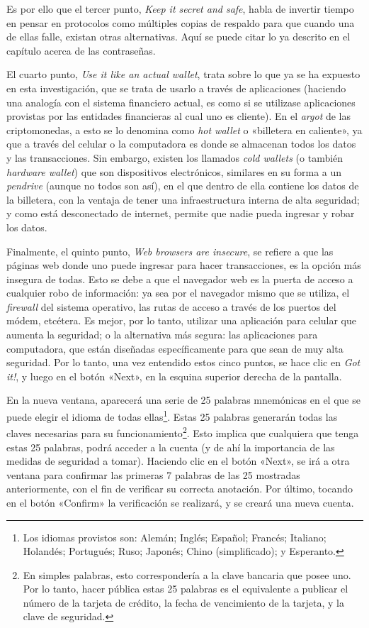\documentclass[12pt,a4paper,twoside]{book}
\begin{document}
Es por ello que el tercer punto, \textit{Keep it secret and safe}, habla de invertir tiempo en pensar en protocolos como múltiples copias de respaldo para que cuando una de ellas falle, existan otras alternativas. Aquí se puede citar lo ya descrito en el capítulo acerca de las contraseñas.

El cuarto punto, \textit{Use it like an actual wallet}, trata sobre lo que ya se ha expuesto en esta investigación, que se trata de usarlo a través de aplicaciones (haciendo una analogía con el sistema financiero actual, es como si se utilizase aplicaciones provistas por las entidades financieras al cual uno es cliente). En el \textit{argot} de las criptomonedas, a esto se lo denomina como \textit{hot wallet} o «billetera en caliente», ya que a través del celular o la computadora es donde se almacenan todos los datos y las transacciones. Sin embargo, existen los llamados \textit{cold wallets} (o también \textit{hardware wallet}) que son dispositivos electrónicos, similares en su forma a un \textit{pendrive} (aunque no todos son así), en el que dentro de ella contiene los datos de la billetera, con la ventaja de tener una infraestructura interna de alta seguridad; y como está desconectado de internet, permite que nadie pueda ingresar y robar los datos.

Finalmente, el quinto punto, \textit{Web browsers are insecure}, se refiere a que las páginas web donde uno puede ingresar para hacer transacciones, es la opción más insegura de todas. Esto se debe a que el navegador web es la puerta de acceso a cualquier robo de información: ya sea por el navegador mismo que se utiliza, el \textit{firewall} del sistema operativo, las rutas de acceso a través de los puertos del módem, etcétera. Es mejor, por lo tanto, utilizar una aplicación para celular que aumenta la seguridad; o la alternativa más segura: las aplicaciones para computadora, que están diseñadas específicamente para que sean de muy alta seguridad. Por lo tanto, una vez entendido estos cinco puntos, se hace clic en \textit{Got it!}, y luego en el botón «Next», en la esquina superior derecha de la pantalla.

En la nueva ventana, aparecerá una serie de 25 palabras mnemónicas en el que se puede elegir el idioma de todas ellas\footnote{Los idiomas provistos son: Alemán; Inglés; Español; Francés; Italiano; Holandés; Portugués; Ruso; Japonés; Chino (simplificado); y Esperanto.}. Estas 25 palabras generarán todas las claves necesarias para su funcionamiento\footnote{En simples palabras, esto correspondería a la clave bancaria que posee uno. Por lo tanto, hacer pública estas 25 palabras es el equivalente a publicar el número de la tarjeta de crédito, la fecha de vencimiento de la tarjeta, y la clave de seguridad.}. Esto implica que cualquiera que tenga estas 25 palabras, podrá acceder a la cuenta (y de ahí la importancia de las medidas de seguridad a tomar). Haciendo clic en el botón «Next», se irá a otra ventana para confirmar las primeras 7 palabras de las 25 mostradas anteriormente, con el fin de verificar su correcta anotación. Por último, tocando en el botón «Confirm» la verificación se realizará, y se creará una nueva cuenta.
\end{document}
